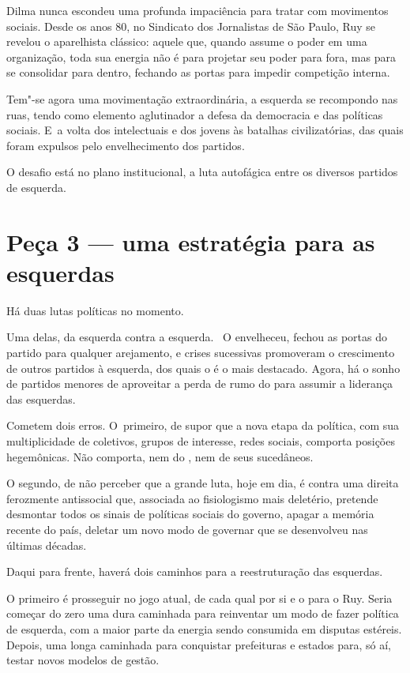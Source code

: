 Dilma nunca escondeu uma profunda impaciência para tratar com movimentos
sociais. Desde os anos 80, no Sindicato dos Jornalistas de São Paulo,
Ruy se revelou o aparelhista clássico: aquele que, quando assume o poder
em uma organização, toda sua energia não é para projetar seu poder para
fora, mas para se consolidar para dentro, fechando as portas para
impedir competição interna.

Tem"-se agora uma movimentação extraordinária, a esquerda se recompondo
nas ruas, tendo como elemento aglutinador a defesa da democracia e das
políticas sociais. E~a volta dos intelectuais e dos jovens às batalhas
civilizatórias, das quais foram expulsos pelo envelhecimento dos
partidos.

O desafio está no plano institucional, a luta autofágica entre os
diversos partidos de esquerda.

\section{Peça 3 --- uma estratégia para as esquerdas}

Há duas lutas políticas no momento.

Uma delas, da esquerda contra a esquerda.~ O  envelheceu, fechou as
portas do partido para qualquer arejamento, e crises sucessivas
promoveram o crescimento de outros partidos à esquerda, dos quais o 
é o mais destacado. Agora, há o sonho de partidos menores de aproveitar
a perda de rumo do  para assumir a liderança das esquerdas.

Cometem dois erros. O~primeiro, de supor que a nova etapa da política,
com sua multiplicidade de coletivos, grupos de interesse, redes sociais,
comporta posições hegemônicas. Não comporta, nem do , nem de seus
sucedâneos.

O segundo, de não perceber que a grande luta, hoje em dia, é contra uma
direita ferozmente antissocial que, associada ao fisiologismo mais
deletério, pretende desmontar todos os sinais de políticas sociais do
governo, apagar a memória recente do país, deletar um novo modo de
governar que se desenvolveu nas últimas décadas.

Daqui para frente, haverá dois caminhos para a reestruturação das
esquerdas.

O primeiro é prosseguir no jogo atual, de cada qual por si e o  para o
Ruy. Seria começar do zero uma dura caminhada para reinventar um modo de
fazer política de esquerda, com a maior parte da energia sendo consumida
em disputas estéreis. Depois, uma longa caminhada para conquistar
prefeituras e estados para, só aí, testar novos modelos de gestão.

